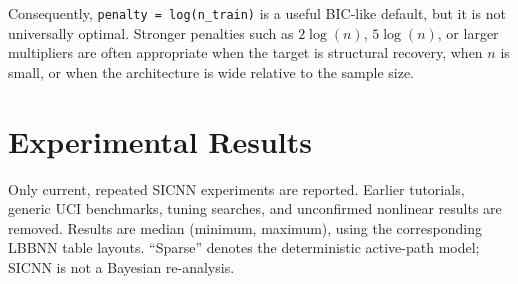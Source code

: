 \documentclass{article}
\begin{document}
Consequently, \texttt{penalty = log(n\_train)} is a useful BIC-like default, but it is not universally optimal. Stronger penalties such as $2\log(n)$, $5\log(n)$, or larger multipliers are often appropriate when the target is structural recovery, when $n$ is small, or when the architecture is wide relative to the sample size.

\section{Experimental Results}
Only current, repeated SICNN experiments are reported. Earlier tutorials, generic UCI benchmarks, tuning searches, and unconfirmed nonlinear results are removed. Results are median (minimum, maximum), using the corresponding LBBNN table layouts. ``Sparse'' denotes the deterministic active-path model; SICNN is not a Bayesian re-analysis.
\end{document}
